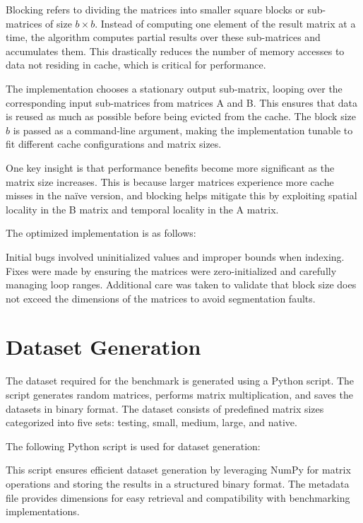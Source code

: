 \documentclass[12pt]{article}
\begin{document}
Blocking refers to dividing the matrices into smaller square blocks or sub-matrices of size \( b \times b \). Instead of computing one element of the result matrix at a time, the algorithm computes partial results over these sub-matrices and accumulates them. This drastically reduces the number of memory accesses to data not residing in cache, which is critical for performance.

The implementation chooses a stationary output sub-matrix, looping over the corresponding input sub-matrices from matrices A and B. This ensures that data is reused as much as possible before being evicted from the cache. The block size \( b \) is passed as a command-line argument, making the implementation tunable to fit different cache configurations and matrix sizes.

One key insight is that performance benefits become more significant as the matrix size increases. This is because larger matrices experience more cache misses in the na\"ive version, and blocking helps mitigate this by exploiting spatial locality in the B matrix and temporal locality in the A matrix.


The optimized implementation is as follows:



Initial bugs involved uninitialized values and improper bounds when indexing. Fixes were made by ensuring the matrices were zero-initialized and carefully managing loop ranges. Additional care was taken to validate that block size does not exceed the dimensions of the matrices to avoid segmentation faults.

\section{Dataset Generation}
The dataset required for the benchmark is generated using a Python script. The script generates random matrices, performs matrix multiplication, and saves the datasets in binary format. The dataset consists of predefined matrix sizes categorized into five sets: testing, small, medium, large, and native.

The following Python script is used for dataset generation:


This script ensures efficient dataset generation by leveraging NumPy for matrix operations and storing the results in a structured binary format. The metadata file provides dimensions for easy retrieval and compatibility with benchmarking implementations.
\end{document}
